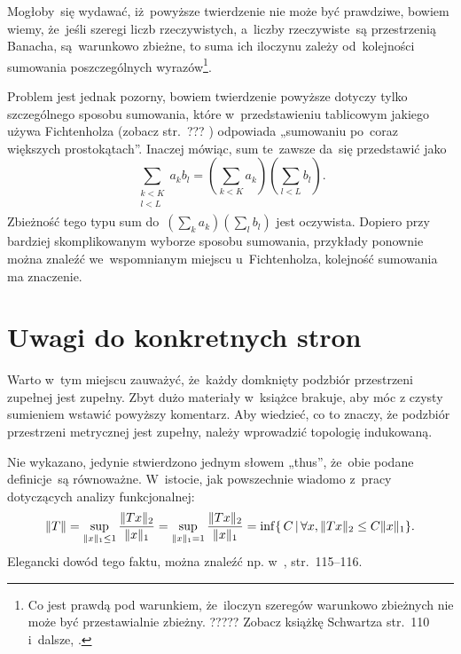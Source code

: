 \documentclass[a4paper,11pt]{article}
\numberwithin{equation}{section}
\begin{document}
Mogłoby~się wydawać, iż~powyższe twierdzenie nie może być prawdziwe,
bowiem wiemy, że~jeśli szeregi liczb rzeczywistych, a~liczby
rzeczywiste~są przestrzenią Banacha, są~warunkowo zbieżne, to suma ich
iloczynu zależy od~kolejności sumowania poszczególnych
wyrazów\footnote{Co jest prawdą pod warunkiem, że~iloczyn szeregów
  warunkowo zbieżnych nie może być przestawialnie zbieżny. ?????
  Zobacz książkę Schwartza str.~110 i~dalsze,
  \parencite{Schwartz-Kurs-analizy-matematycznej-Vol-I-Pub-1979}.}.

Problem jest jednak pozorny, bowiem twierdzenie powyższe dotyczy tylko
szczególnego sposobu sumowania, które w~przedstawieniu tablicowym
jakiego używa Fichtenholza (zobacz str.~???
\parencite{Fichtenholz-Rachunek-rozniczkowy-ETC-Vol-I-Pub-2005})
odpowiada „sumowaniu po~coraz większych prostokątach”. Inaczej
mówiąc, sum te~zawsze da~się przedstawić jako
\begin{equation}
  \label{eq:RS-Vol-I-s02-07}
  \sum_{ \substack{ k < K \\
      l < L \\ } } a_{ k } b_{ l }
  = ( \sum_{ k < K } a_{ k } ) ( \sum_{ l < L } b_{ l } ).
\end{equation}
Zbieżność tego typu sum
do~$( \sum_{ k } a_{ k } ) ( \sum_{ l } b_{ l } )$ jest oczywista.
Dopiero przy bardziej skomplikowanym wyborze sposobu sumowania,
przykłady ponownie można znaleźć we~wspomnianym miejscu
u~Fichtenholza, kolejność sumowania ma znaczenie. %

\VerSpaceTwo










\section{Uwagi do konkretnych stron}

\label{sec:-ETC-Uwagi-ogolne}


\noindent
{} Warto w~tym miejscu zauważyć, że~każdy domknięty
podzbiór przestrzeni zupełnej jest zupełny. Zbyt dużo materiały w~książce
brakuje, aby móc z czysty sumieniem wstawić powyższy
komentarz. Aby wiedzieć, co to znaczy, że podzbiór przestrzeni
metrycznej jest zupełny, należy wprowadzić topologię indukowaną.


\noindent
{} Nie wykazano, jedynie stwierdzono jednym słowem
„thus”, że~obie podane definicje~są równoważne. W~istocie, jak
powszechnie wiadomo z~pracy dotyczących analizy funkcjonalnej:
\begin{equation}
  \label{eq:RS-Vol-I-s01-12}
  \lVert{  T  }\rVert =
  \sup_{ \lVert{  x  }\rVert_{ 1 } \leq 1 } \frac{ \lVert{  T x  }\rVert_{ 2 } }{ \lVert{  x  }\rVert_{ 1 } }
  =
  \sup_{ \lVert{  x  }\rVert_{ 1 } = 1 }
  \frac{ \lVert{  T x  }\rVert_{ 2 } }{ \lVert{  x  }\rVert_{ 1 } }
  = \inf \{ \, C \, | \, \forall x, \lVert{  T x  }\rVert_{ 2 } \leq C \lVert{  x  }\rVert_{ 1 } \}.
\end{equation}
Elegancki dowód tego faktu, można znaleźć np.
w~\parencite{Chmielinski-Analiza-funkcjonalna-Pub-2004},
str.~115--116. %
\end{document}
